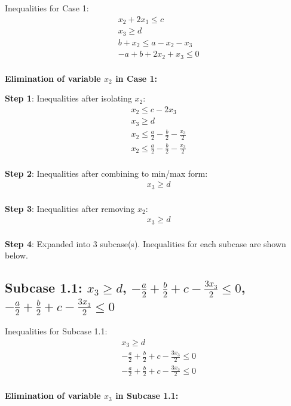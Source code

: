 \documentclass{article}
\begin{document}
Inequalities for Case 1:
\begin{align}
& x_{2} + 2 x_{3} \leq c \\
& x_{3} \geq d \\
& b + x_{2} \leq a - x_{2} - x_{3} \\
& - a + b + 2 x_{2} + x_{3} \leq 0 \\
\end{align}

\textbf{Elimination of variable $x_{2}$ in Case 1:}

\textbf{Step 1}: Inequalities after isolating $x_{2}$:
\begin{align}
& x_{2} \leq c - 2 x_{3} \\
& x_{3} \geq d \\
& x_{2} \leq \frac{a}{2} - \frac{b}{2} - \frac{x_{3}}{2} \\
& x_{2} \leq \frac{a}{2} - \frac{b}{2} - \frac{x_{3}}{2} \\
\end{align}

\textbf{Step 2}: Inequalities after combining to min/max form:
\begin{align}
& x_{3} \geq d \\
\end{align}

\textbf{Step 3}: Inequalities after removing $x_{2}$:
\begin{align}
& x_{3} \geq d \\
\end{align}

\textbf{Step 4}: Expanded into 3 subcase(s). Inequalities for each subcase are shown below.

\subsection{Subcase 1.1: $x_{3} \geq d$, $- \frac{a}{2} + \frac{b}{2} + c - \frac{3 x_{3}}{2} \leq 0$, $- \frac{a}{2} + \frac{b}{2} + c - \frac{3 x_{3}}{2} \leq 0$}

Inequalities for Subcase 1.1:
\begin{align}
& x_{3} \geq d \\
& - \frac{a}{2} + \frac{b}{2} + c - \frac{3 x_{3}}{2} \leq 0 \\
& - \frac{a}{2} + \frac{b}{2} + c - \frac{3 x_{3}}{2} \leq 0 \\
\end{align}

\textbf{Elimination of variable $x_{3}$ in Subcase 1.1:}
\end{document}
